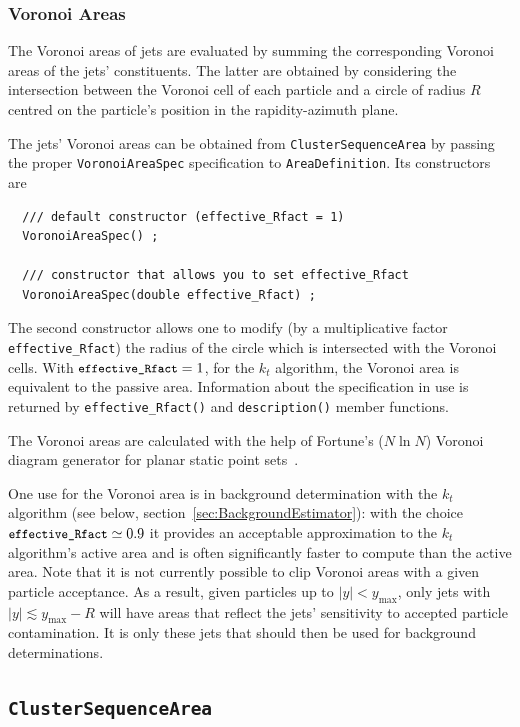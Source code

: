 \documentclass[12pt,a4]{article}
\newcommand{\ttt}[1]{{\small\texttt{#1}}}
\begin{document}
\subsubsection{Voronoi Areas}
\label{sec:voronoi-areas}

The Voronoi areas of jets are evaluated by summing the corresponding
Voronoi areas of the jets' constituents. The latter are obtained 
by considering the intersection between
the Voronoi cell of each particle and a circle of radius $R$ centred 
on the particle's position in the rapidity-azimuth plane.

The jets' Voronoi areas can be obtained from 
\ttt{ClusterSequenceArea} by passing
the proper \ttt{VoronoiAreaSpec} specification to
\ttt{AreaDefinition}. Its constructors are
\begin{lstlisting}
  /// default constructor (effective_Rfact = 1)
  VoronoiAreaSpec() ;
  
  /// constructor that allows you to set effective_Rfact
  VoronoiAreaSpec(double effective_Rfact) ; 
\end{lstlisting}
The second constructor allows one to modify (by a multiplicative
factor \ttt{effective\_Rfact}) the radius of the circle which is
intersected with the Voronoi cells. With $\ttt{effective\_Rfact} = 1$,
for the $k_t$ algorithm, the Voronoi area is equivalent to the passive
area.
%
Information about the specification in use is returned by
\ttt{effective\_Rfact()} and \ttt{description()} member functions.

The Voronoi areas are calculated with the help of Fortune's ($N \ln
N$) Voronoi diagram generator for planar static point
sets~\cite{Fortune}.

One use for the Voronoi area is in background determination with the
$k_t$ algorithm (see below, section~\ref{sec:BackgroundEstimator}): with
the choice $\ttt{effective\_Rfact}\simeq0.9$ it provides an acceptable
approximation to the $k_t$ algorithm's active area and is often
significantly faster to compute than the active area.
%
Note that it is not currently possible to clip Voronoi areas with a
given particle acceptance. 
%
As a result, given particles up to $|y|<y_{\max}$, only jets with $|y|
\lesssim y_{\max} - R$ will have areas that reflect the jets'
sensitivity to accepted particle contamination.
%
It is only these jets that should then be used for background
determinations.

\subsection{\tt ClusterSequenceArea}
\end{document}
